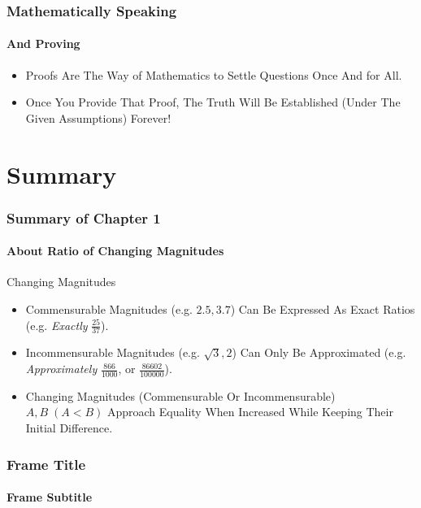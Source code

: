 \documentclass{beamer}
\begin{document}
\begin{frame}
\frametitle{Mathematically Speaking}
\framesubtitle{And Proving}
\label{slide:whyspeakmathematically}

\begin{itemize}
\pause
\item
\alert{Proofs} Are The Way of Mathematics to Settle Questions Once And for All.
\pause
\item Once You Provide That Proof, The Truth Will Be Established (Under The Given Assumptions) Forever!
\end{itemize}
\end{frame}

\section*{Summary}
\begin{frame}
\frametitle{Summary of Chapter 1}
\framesubtitle{About Ratio of Changing Magnitudes}
\label{slide:summarych1}
\begin{block}{Changing Magnitudes}
\begin{itemize}
\pause
\item Commensurable Magnitudes (e.g. $2.5, 3.7$) Can Be Expressed As \alert{Exact Ratios} (e.g. \textit{Exactly} $\frac{25}{37}$).
\pause
\item Incommensurable Magnitudes (e.g. $\sqrt{3}, 2$) Can Only Be Approximated (e.g. \textit{Approximately} $\frac{866}{1000}$, or $\frac{86602}{100000}$).
\pause
\item Changing Magnitudes (\alert{Commensurable Or Incommensurable}) $A, B\;(A<B)$ Approach Equality When Increased While Keeping Their Initial Difference.
\end{itemize}
\end{block}
\end{frame}
\begin{frame}
\frametitle{Frame Title}
\framesubtitle{Frame Subtitle}
\label{slide:slidelabel}
\end{frame}
\end{document}
